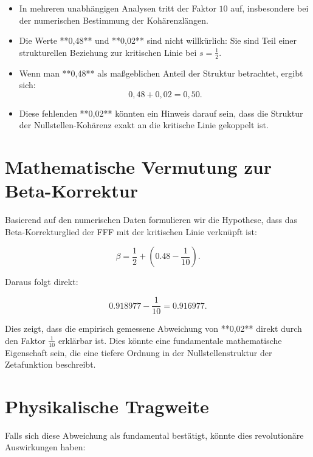 \documentclass[a4paper,12pt]{article}
\begin{document}
\begin{itemize}
    \item In mehreren unabhängigen Analysen tritt der Faktor \( 10 \) auf, insbesondere bei der numerischen Bestimmung der Kohärenzlängen.
    \item Die Werte **0,48** und **0,02** sind nicht willkürlich: Sie sind Teil einer strukturellen Beziehung zur kritischen Linie bei \( s = \frac{1}{2} \).
    \item Wenn man **0,48** als maßgeblichen Anteil der Struktur betrachtet, ergibt sich:  
          \begin{equation}
              0,48 + 0,02 = 0,50.
          \end{equation}
    \item Diese fehlenden **0,02** könnten ein Hinweis darauf sein, dass die Struktur der Nullstellen-Kohärenz exakt an die kritische Linie gekoppelt ist.
\end{itemize}

\section{Mathematische Vermutung zur Beta-Korrektur}

Basierend auf den numerischen Daten formulieren wir die Hypothese, dass das Beta-Korrekturglied der FFF mit der kritischen Linie verknüpft ist:

\begin{equation}
    \beta = \frac{1}{2} + \left( 0.48 - \frac{1}{10} \right).
\end{equation}

Daraus folgt direkt:

\begin{equation}
    0.918977 - \frac{1}{10} = 0.916977.
\end{equation}

Dies zeigt, dass die empirisch gemessene Abweichung von **0,02** direkt durch den Faktor \( \frac{1}{10} \) erklärbar ist. Dies könnte eine fundamentale mathematische Eigenschaft sein, die eine tiefere Ordnung in der Nullstellenstruktur der Zetafunktion beschreibt.

\section{Physikalische Tragweite}

Falls sich diese Abweichung als fundamental bestätigt, könnte dies revolutionäre Auswirkungen haben:
\end{document}
